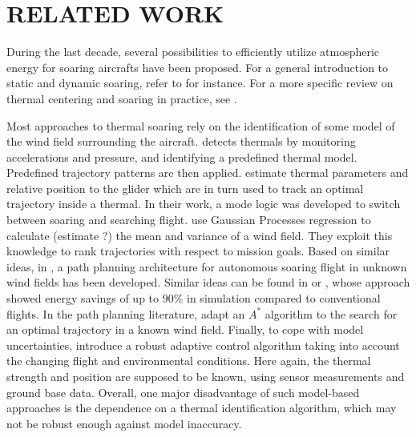 \documentclass[a4paper, 10pt, conference]{ieeeconf}
\begin{document}
\section{RELATED WORK}
\label{sec:relwork}

During the last decade, several possibilities to efficiently utilize atmospheric energy for soaring aircrafts have been proposed. For a general introduction to static and dynamic soaring, refer to \cite{chen1981} for instance. For a more specific review on thermal centering and soaring in practice, see \cite{reichmann}.

Most approaches to thermal soaring rely on the identification of some model of the wind field surrounding the aircraft. \cite{allen05} detects thermals by monitoring accelerations and pressure, and identifying a predefined thermal model. Predefined trajectory patterns are then applied. \cite{allen07} estimate thermal parameters and relative position to the glider which are in turn used to track an optimal trajectory inside a thermal. In their work, a mode logic was developed to switch between soaring and searching flight. \cite{lawrance11} use Gaussian Processes regression to calculate {\color{red}(estimate ?)} the mean and variance of a wind field. They exploit this knowledge to rank trajectories with respect to mission goals. Based on similar ideas, in \cite{lawrance_phd}, a path planning architecture for autonomous soaring flight in unknown wind fields has been developed. Similar ideas can be found in \cite{bencatel13} or \cite{chen11}, whose approach showed energy savings of up to 90\% in simulation compared to conventional flights. In the path planning literature, \cite{chakrabarty} adapt an $A^*$ algorithm to the search for an optimal trajectory in a known wind field. Finally, to cope with model uncertainties, \cite{kahveci} introduce a robust adaptive control algorithm taking into account the changing flight and environmental conditions.
{\color{red}Here} again, the thermal strength and position are supposed to be known, using sensor measurements and ground base data. Overall, one major disadvantage of such model-based approaches is the dependence on a thermal identification algorithm, which may not be robust enough against model inaccuracy. 

\end{document}
